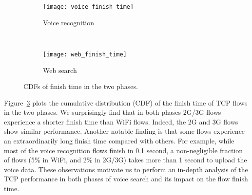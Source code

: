 
\begin{figure}[th]
\centering
\begin{subfigure}[b]{0.8\linewidth}
	\texttt{[image: voice\_finish\_time]}
\caption{Voice recognition}
\label{fig:voice_finish_time}
\end{subfigure} \\
\begin{subfigure}[b]{0.8\linewidth}
	\texttt{[image: web\_finish\_time]}
\caption{Web search}
\label{fig:web_finish_time}
\end{subfigure}
\caption{CDFs of finish time in the two phases.}
\label{fig:finish_time}
\end{figure}



Figure~\ref{fig:finish_time} plots the cumulative distribution (CDF) of the finish time of TCP flows in the two phases. We surprisingly find that in both phases 2G/3G flows experience a shorter finish time than WiFi flows. Indeed, the 2G and 3G flows show similar performance. Another notable finding is that some flows experience an extraordinarily long finish time compared with others. For example, while most of the voice recognition flows finish in 0.1 second, a non-negligible fraction of flows (5\% in WiFi, and 2\% in 2G/3G) takes more than 1 second to upload the voice data. These observations motivate us to perform an in-depth analysis of the TCP performance in both phases of voice search and its impact on the flow finish time. 

